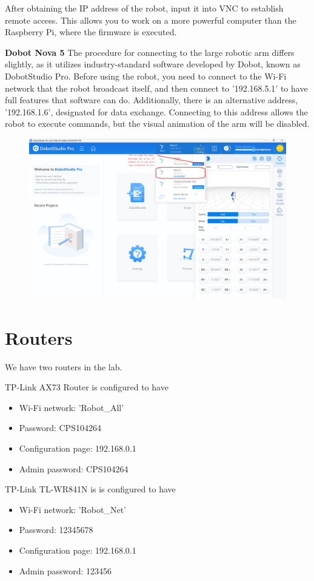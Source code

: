 \documentclass[hidelinks]{article}
\begin{document}
After obtaining the IP address of the robot, input it into VNC to establish remote access. This allows you to work on a more powerful computer than the Raspberry Pi, where the firmware is executed.

\textbf{Dobot Nova 5}
The procedure for connecting to the large robotic arm differs slightly, as it utilizes industry-standard software developed by Dobot, known as DobotStudio Pro. Before using the robot, you need to connect to the Wi-Fi network that the robot broadcast itself, and then connect to '192.168.5.1' to have full features that software can do. Additionally, there is an alternative address, '192.168.1.6', designated for data exchange. Connecting to this address allows the robot to execute commands, but the visual animation of the arm will be disabled.
\begin{figure}[H]
    \centering
    \includegraphics[width=0.8\linewidth]{Figures/dobot_gui.png}
\end{figure}

\newpage
\section*{Routers}
We have two routers in the lab. 

\begin{minipage}[t]{0.5\linewidth}
    TP-Link AX73 Router is configured to have 
    \begin{itemize}
        \item Wi-Fi network: 'Robot\_All'
        \item Password: CPS104264 
        \item Configuration page: 192.168.0.1
        \item Admin password: CPS104264
    \end{itemize}
\end{minipage}%
\begin{minipage}[t]{0.5\linewidth}
    TP-Link TL-WR841N is is configured to have 
    \begin{itemize}
        \item Wi-Fi network: 'Robot\_Net'
        \item Password: 12345678 
        \item Configuration page: 192.168.0.1
        \item Admin password: 123456
    \end{itemize}
\end{minipage}
\end{document}
